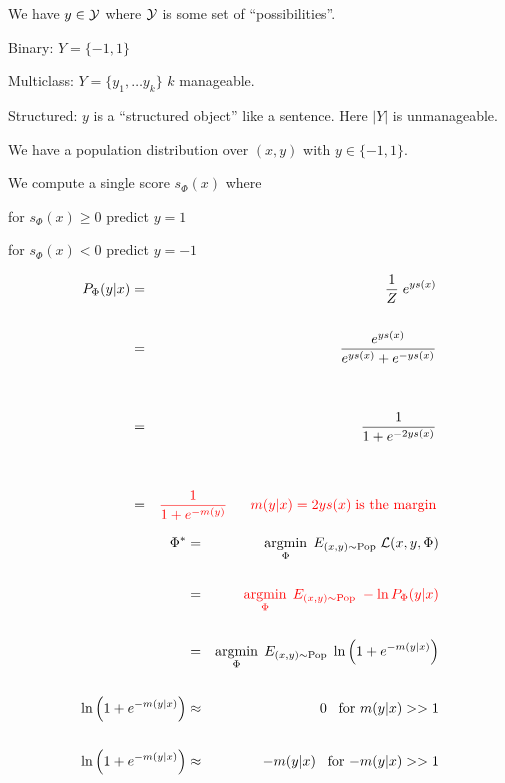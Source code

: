 {We have {\color{red} $y \in {\cal Y}$} where {\color{red} ${\cal Y}$} is some set of ``possibilities''.

\vfill
Binary: {\color{red} $Y = \{-1,1\}$}

\vfill
Multiclass: {\color{red} $Y = \{y_1,\ldots y_k\}$} $k$ manageable.

\vfill
Structured: {\color{red} $y$} is a ``structured object'' like a sentence.  Here {\color{red} $|Y|$} is unmanageable.


We have a population distribution over $(x,y)$ with $y \in \{-1,1\}$.

\vfill
We compute a single score $s_\Phi(x)$ where

\vfill
for $s_\Phi(x) \geq 0$ predict $y = 1$

\vfill
for $s_\Phi(x) < 0$ predict $y = -1$


\begin{eqnarray*}
  P_\Phi(y|x) & = & \frac{1}{Z} \;e^{ys(x)} \\
  \\
  & = & \frac{e^{ys(x)}}{e^{ys(x)} + e^{-ys(x)}} \\
  \\
  \\
  & = & \frac{1}{1 + e^{-2ys(x)}} \\
  \\
  \\
    & = & {\color{red} \frac{1}{1 + e^{-m(y)}} \;\;\;\;\;\;m(y|x) = 2ys(x)\;\mbox{is the margin}}
\end{eqnarray*}


\begin{eqnarray*}
  \Phi^* & = & \operatorname*{argmin}_\Phi\;E_{(x,y) \sim \mathrm{Pop}}\;{\cal L}(x,y,\Phi) \\
  \\
  & = & {\color{red} \operatorname*{argmin}_\Phi\;E_{(x,y) \sim \mathrm{Pop}}\;-\ln P_\Phi(y|x)} \\
  \\
  & = & \operatorname*{argmin}_\Phi\;E_{(x,y) \sim \mathrm{Pop}}\;\ln \left(1 + e^{-m(y|x)}\right) \\
  \\
  \ln \left(1 + e^{-m(y|x)}\right) & \approx & 0 \;\;\;\mbox{for $m(y|x) >> 1$} \\
  \\
  \ln \left(1 + e^{-m(y|x)}\right) & \approx & -m(y|x) \;\;\;\mbox{for $-m(y|x) >> 1$} \\
\end{eqnarray*}

}
